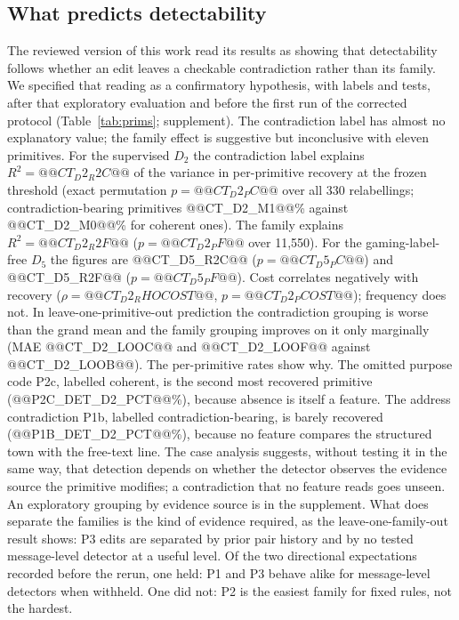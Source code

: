 \documentclass[conference]{IEEEtran}
\begin{document}
\subsection{What predicts detectability}\label{sec:ct}
The reviewed version of this work read its results as showing that
detectability follows whether an edit leaves a checkable contradiction rather
than its family. We specified that reading as a confirmatory hypothesis, with labels and
tests, after that exploratory evaluation and before the first run of the
corrected protocol (Table~\ref{tab:prims}; supplement). The contradiction label has almost no explanatory value; the family effect
is suggestive but inconclusive with eleven primitives. For the supervised
$D_2$ the contradiction
label explains $R^2=@@CT_D2_R2C@@$ of the variance in per-primitive recovery
at the frozen threshold (exact permutation $p=@@CT_D2_PC@@$ over all 330
relabellings; contradiction-bearing primitives @@CT_D2_M1@@\% against
@@CT_D2_M0@@\% for coherent ones). The family explains $R^2=@@CT_D2_R2F@@$
($p=@@CT_D2_PF@@$ over 11,550). For the gaming-label-free $D_5$ the figures are
@@CT_D5_R2C@@ ($p=@@CT_D5_PC@@$) and @@CT_D5_R2F@@ ($p=@@CT_D5_PF@@$). Cost
correlates negatively with recovery ($\rho=@@CT_D2_RHOCOST@@$,
$p=@@CT_D2_PCOST@@$); frequency does not. In leave-one-primitive-out prediction the
contradiction grouping is worse than the grand mean and the family grouping
improves on it only marginally (MAE @@CT_D2_LOOC@@ and @@CT_D2_LOOF@@ against
@@CT_D2_LOOB@@). The per-primitive rates show why.
The omitted purpose code P2c, labelled coherent, is the second most recovered
primitive (@@P2C_DET_D2_PCT@@\%), because absence is itself a feature. The
address contradiction P1b, labelled contradiction-bearing, is barely
recovered (@@P1B_DET_D2_PCT@@\%), because no feature compares the structured
town with the free-text line. The case analysis suggests, without testing it in the same way, that
detection depends on whether the detector observes the evidence source the
primitive modifies; a contradiction that no feature reads goes unseen. An
exploratory grouping by evidence source is in the supplement. What does
separate the families is the kind of evidence required, as the
leave-one-family-out result shows: P3 edits are separated by prior pair history
and by no tested message-level detector at a useful level. Of the two directional expectations recorded
before the rerun, one held: P1 and P3 behave alike for message-level
detectors when withheld. One did not: P2 is the easiest family for fixed
rules, not the hardest.
\end{document}
